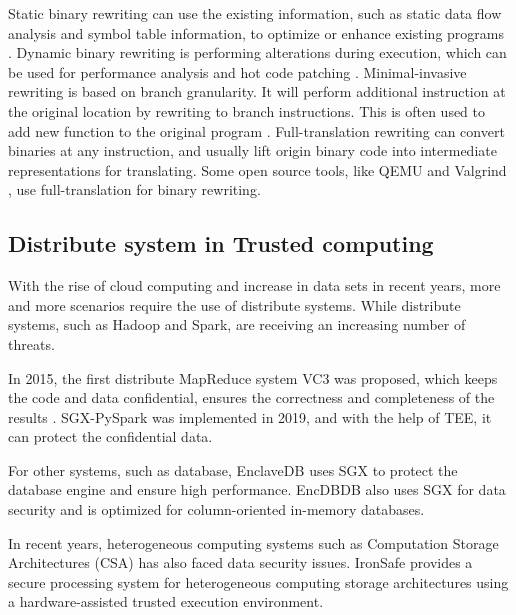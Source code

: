 Static binary rewriting can use the existing information, such as static data flow analysis and
symbol table information, to optimize or enhance existing programs \cite{10.1145/2629335, Schwarz2007PLTOAL}. 
Dynamic binary rewriting is performing alterations during execution, which can be used for performance
analysis \cite{Luk2005PinBC} and hot code patching \cite{Bruening2003AnIF}.
Minimal-invasive rewriting is based on branch granularity. It will perform additional instruction
at the original location by rewriting to branch instructions. This is often used to add new
function to the original program \cite{Federico2017revngAU}.
Full-translation rewriting can convert binaries at any instruction, and usually lift origin binary code
into intermediate representations for translating. Some open source tools,
like QEMU \cite{Bellard2005QEMUAF} and Valgrind \cite{Nethercote2007ValgrindAF},
use full-translation for binary rewriting.


\subsection{Distribute system in Trusted computing}
With the rise of cloud computing and increase in data sets in recent years,
more and more scenarios require the use of distribute systems.
While distribute systems, such as Hadoop and Spark, are receiving an increasing number of threats.

In 2015, the first distribute MapReduce system VC3 was proposed, which keeps the code and
data confidential, ensures the correctness and completeness of the results \cite{Schuster2015VC3TD}.
SGX-PySpark \cite{Quoc2019SGXPySparkSD} was implemented in 2019, and with the help of TEE, it can protect
the confidential data.

For other systems, such as database, EnclaveDB \cite{Priebe2018EnclaveDBAS} uses SGX to protect the database engine
and ensure high performance. EncDBDB \cite{Fuhry2021EncDBDBSE} also uses SGX for data security and is optimized
for column-oriented in-memory databases.

In recent years, heterogeneous computing systems such as Computation Storage Architectures (CSA) 
has also faced data security issues.
IronSafe \cite{Unnibhavi2022SecureAP} provides a secure processing system for heterogeneous computing storage
architectures using a hardware-assisted trusted execution environment.